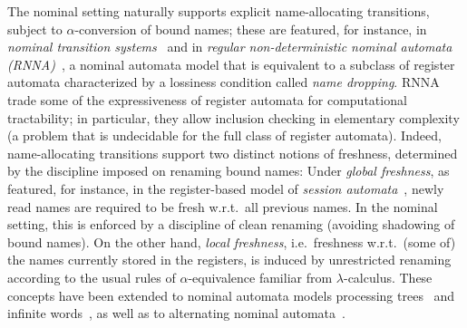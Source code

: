 \documentclass[a4paper,UKenglish,cleveref,thm-restate,numberwithinsect,final]{lipics-v2021}
\theoremstyle{plain}
\numberwithin{equation}{section}
\newcommand{\+}[1]{\mathcal{#1}\xspace}
\theoremstyle{definition}
\begin{document}
The nominal setting naturally supports explicit name-allocating
transitions, subject to $\alpha$-conversion of bound names; these are
featured, for instance, in \emph{nominal transition
  systems}~\cite{ParrowEA21} and in \emph{regular non-deterministic
  nominal automata (RNNA)}~\cite{SchroderEA17}, a nominal automata
model that is equivalent to a subclass of register automata
characterized by a lossiness condition called \emph{name
  dropping}. RNNA trade some of the expressiveness of register
automata for computational tractability; in particular, they allow
inclusion checking in elementary complexity (a problem that is
undecidable for the full class of register automata). Indeed,
name-allocating transitions support two distinct notions of freshness,
determined by the discipline imposed on renaming bound names: Under
\emph{global freshness}, as featured, for instance, in the
register-based model of \emph{session automata}~\cite{BolligEA14},
newly read names are required to be fresh w.r.t.~all previous
names. In the nominal setting, this is enforced by a discipline of
clean renaming (avoiding shadowing of bound names). On the other hand,
\emph{local freshness}, i.e.\ freshness w.r.t.\ (some of) the names
currently stored in the registers, is induced by unrestricted renaming
according to the usual rules of $\alpha$-equivalence familiar from
$\lambda$-calculus. These concepts have been extended to nominal
automata models processing trees~\cite{PruckerSchroder24} and infinite
words~\cite{UrbatEA21}, as well as to alternating nominal
automata~\cite{FrankEA25}.
\end{document}
